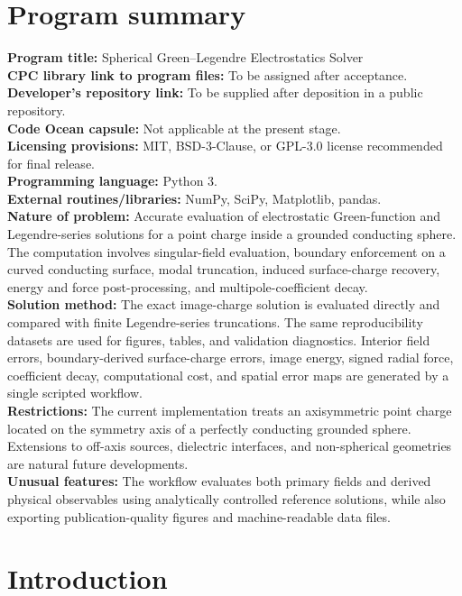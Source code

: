 \documentclass[preprint,12pt]{elsarticle}
\begin{document}
\linenumbers

\section*{Program summary}
\noindent\textbf{Program title:} Spherical Green--Legendre Electrostatics Solver\\
\textbf{CPC library link to program files:} To be assigned after acceptance.\\
\textbf{Developer's repository link:} To be supplied after deposition in a public repository.\\
\textbf{Code Ocean capsule:} Not applicable at the present stage.\\
\textbf{Licensing provisions:} MIT, BSD-3-Clause, or GPL-3.0 license recommended for final release.\\
\textbf{Programming language:} Python 3.\\
\textbf{External routines/libraries:} NumPy, SciPy, Matplotlib, pandas.\\
\textbf{Nature of problem:} Accurate evaluation of electrostatic Green-function and Legendre-series solutions for a point charge inside a grounded conducting sphere. The computation involves singular-field evaluation, boundary enforcement on a curved conducting surface, modal truncation, induced surface-charge recovery, energy and force post-processing, and multipole-coefficient decay.\\
\textbf{Solution method:} The exact image-charge solution is evaluated directly and compared with finite Legendre-series truncations. The same reproducibility datasets are used for figures, tables, and validation diagnostics. Interior field errors, boundary-derived surface-charge errors, image energy, signed radial force, coefficient decay, computational cost, and spatial error maps are generated by a single scripted workflow.\\
\textbf{Restrictions:} The current implementation treats an axisymmetric point charge located on the symmetry axis of a perfectly conducting grounded sphere. Extensions to off-axis sources, dielectric interfaces, and non-spherical geometries are natural future developments.\\
\textbf{Unusual features:} The workflow evaluates both primary fields and derived physical observables using analytically controlled reference solutions, while also exporting publication-quality figures and machine-readable data files.

\section{Introduction}
\end{document}
